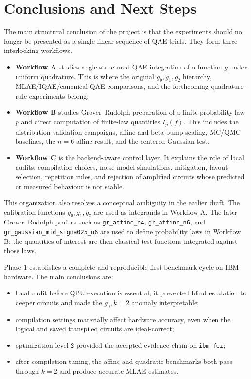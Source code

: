 \section{Conclusions and Next Steps}
\label{sec:conclusions}

The main structural conclusion of the project is that the experiments should no
longer be presented as a single linear sequence of QAE trials. They form three
interlocking workflows.

\begin{itemize}[leftmargin=*]
  \item \textbf{Workflow A} studies angle-structured QAE integration of a
        function \(g\) under uniform quadrature. This is where the original
        \(g_0,g_1,g_2\) hierarchy, MLAE/IQAE/canonical-QAE comparisons, and the
        forthcoming quadrature-rule experiments belong.
  \item \textbf{Workflow B} studies Grover--Rudolph preparation of a finite
        probability law \(p\) and direct computation of finite-law quantities
        \(I_p(f)\). This includes the distribution-validation campaigns,
        affine and beta-bump scaling, MC/QMC baselines, the \(n=6\) affine
        result, and the centered Gaussian test.
  \item \textbf{Workflow C} is the backend-aware control layer. It explains the
        role of local audits, compilation choices, noise-model simulations,
        mitigation, layout selection, repetition rules, and rejection of
        amplified circuits whose predicted or measured behaviour is not stable.
\end{itemize}

This organization also resolves a conceptual ambiguity in the earlier draft.
The calibration functions \(g_0,g_1,g_2\) are used as integrands in Workflow A.
The later Grover--Rudolph profiles such as \texttt{gr\_affine\_n4},
\texttt{gr\_affine\_n6}, and
\texttt{gr\_gaussian\_mid\_sigma025\_n6} are used to define probability laws in
Workflow B; the quantities of interest are then classical test functions
integrated against those laws.

Phase 1 establishes a complete and reproducible first benchmark cycle on IBM
hardware. The main conclusions are:
\begin{itemize}[leftmargin=*]
  \item local audit before QPU execution is essential; it prevented blind
        escalation to deeper circuits and made the \(g_0,k=2\) anomaly
        interpretable;
  \item compilation settings materially affect hardware accuracy, even when the
        logical and saved transpiled circuits are ideal-correct;
  \item optimization level 2 provided the accepted evidence chain on
        \texttt{ibm\_fez};
  \item after compilation tuning, the affine and quadratic benchmarks both pass
        through \(k=2\) and produce accurate MLAE estimates.
\end{itemize}


